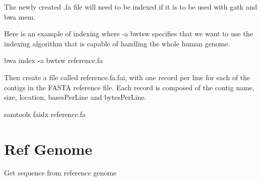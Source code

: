 \documentclass[]{book}
\newenvironment{Shaded}{\begin{snugshade}}{\end{snugshade}}
\newcommand{\CharTok}[1]{\textcolor[rgb]{0.31,0.60,0.02}{#1}}
\newcommand{\CommentTok}[1]{\textcolor[rgb]{0.56,0.35,0.01}{\textit{#1}}}
\newcommand{\ControlFlowTok}[1]{\textcolor[rgb]{0.13,0.29,0.53}{\textbf{#1}}}
\newcommand{\ImportTok}[1]{#1}
\newcommand{\KeywordTok}[1]{\textcolor[rgb]{0.13,0.29,0.53}{\textbf{#1}}}
\newcommand{\NormalTok}[1]{#1}
\newcommand{\OperatorTok}[1]{\textcolor[rgb]{0.81,0.36,0.00}{\textbf{#1}}}
\newcommand{\SpecialCharTok}[1]{\textcolor[rgb]{0.00,0.00,0.00}{#1}}
\newcommand{\StringTok}[1]{\textcolor[rgb]{0.31,0.60,0.02}{#1}}
\newcommand{\VariableTok}[1]{\textcolor[rgb]{0.00,0.00,0.00}{#1}}
\begin{document}
The newly created .fa file will need to be indexed if it is to be used with gatk and bwa mem.

Here is an example of indexing where -a bwtsw specifies that we want to use the indexing algorithm that is capable of handling the whole human genome.

\begin{Shaded}
\begin{Highlighting}[]
\NormalTok{bwa index }\OperatorTok{-}\NormalTok{a bwtsw reference.fa}
\end{Highlighting}
\end{Shaded}

Then create a file called reference.fa.fai, with one record per line for each of the contigs in the FASTA reference file. Each record is composed of the contig name, size, location, basesPerLine and bytesPerLine.

\begin{Shaded}
\begin{Highlighting}[]
\NormalTok{samtools faidx reference.fa}
\end{Highlighting}
\end{Shaded}

\hypertarget{ref-genome}{%
\section{Ref Genome}\label{ref-genome}}

Get sequence from reference genome

\begin{Shaded}
\end{Shaded}
\end{document}
